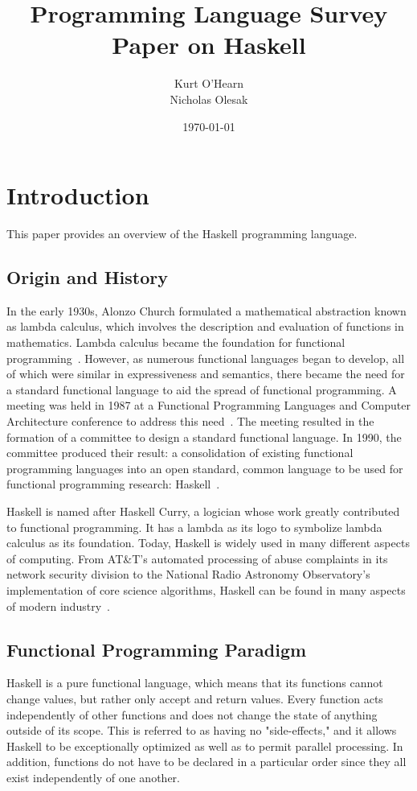 \documentclass[titlepage,12pt]{article}
\title{Programming Language Survey Paper on Haskell}
\author{
        Kurt O'Hearn\\
        Nicholas Olesak\\
}
\date{\today}
\begin{document}
\maketitle 
\setcounter{tocdepth}{3}
\tableofcontents \newpage

\section{Introduction}
This paper provides an overview of the Haskell programming language.

\subsection{Origin and History}

In the early 1930s, Alonzo Church formulated a mathematical abstraction known as lambda calculus, which involves the description 
and evaluation of functions in mathematics. Lambda calculus became the foundation for functional programming~\cite{haskell-wiki}. 
However, as numerous functional languages began to develop, all of which were similar in expressiveness and semantics, there 
became the need for a standard functional language to aid the spread of functional programming. A meeting was held 
in 1987 at a Functional Programming Languages and Computer Architecture conference to address this need~\cite{hudak-hist}. The meeting 
resulted in the formation of a committee to design a standard functional language. In 1990, the committee produced their result: 
a consolidation of existing functional programming languages into an open standard, common language to be used for 
functional programming research: Haskell~\cite{hudak-con}.

Haskell is named after Haskell Curry, a logician whose work greatly contributed to functional programming. It has a 
lambda as its logo to symbolize lambda calculus as its foundation. Today, Haskell is widely used in many different aspects 
of computing. From AT\&T's automated processing of abuse complaints in its network security division to the National 
Radio Astronomy Observatory’s implementation of core science algorithms, Haskell can be found in many aspects of 
modern industry~\cite{haskell-wiki}. 

\subsection{Functional Programming Paradigm}

Haskell is a pure functional language, which means that its functions cannot change values, but rather only accept and 
return values. Every function acts independently of other functions and does not change the state of anything outside 
of its scope. This is referred to as having no "side-effects," and it allows Haskell to be exceptionally optimized as 
well as to permit parallel processing. In addition, functions do not have to be declared in a particular order since 
they all exist independently of one another. 
\end{document}
